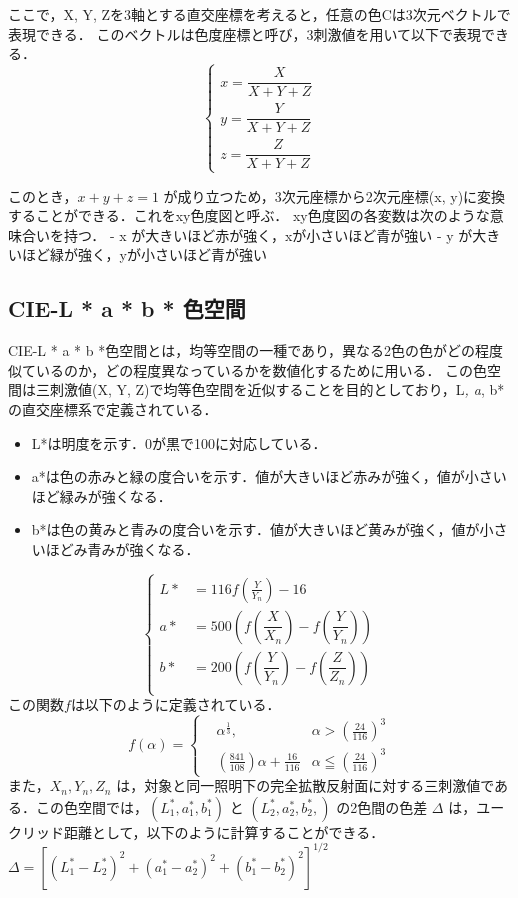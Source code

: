 \documentclass[
]{article}
\begin{document}
ここで，X, Y,
Zを3軸とする直交座標を考えると，任意の色Cは3次元ベクトルで表現できる．
このベクトルは色度座標と呼び，3刺激値を用いて以下で表現できる． 
\begin{equation}
\left\{
\begin{aligned}
    x = \dfrac{X}{X + Y + Z} \\
    y = \dfrac{Y}{X + Y + Z} \\
    z = \dfrac{Z}{X + Y + Z} 
\end{aligned}
\right.
\end{equation}

このとき，\(x + y + z = 1\) が成り立つため，3次元座標から2次元座標(x,
y)に変換することができる．これをxy色度図と呼ぶ．
xy色度図の各変数は次のような意味合いを持つ． - x
が大きいほど赤が強く，xが小さいほど青が強い - y
が大きいほど緑が強く，yが小さいほど青が強い

\hypertarget{cie-l-a-b-ux8272ux7a7aux9593}{%
\subsection{CIE-L * a * b * 色空間}\label{cie-l-a-b-ux8272ux7a7aux9593}}

CIE-L * a * b *色空間とは，均等空間の一種であり，異なる2色の色がどの程度似ているのか，どの程度異なっているかを数値化するために用いる．
この色空間は三刺激値(X, Y,
Z)で均等色空間を近似することを目的としており，L\emph{, a}, b*
の直交座標系で定義されている． 
\begin{itemize}
  \item L*は明度を示す．0が黒で100に対応している． 
  \item a*は色の赤みと緑の度合いを示す．値が大きいほど赤みが強く，値が小さいほど緑みが強くなる．
  \item b*は色の黄みと青みの度合いを示す．値が大きいほど黄みが強く，値が小さいほどみ青みが強くなる．
\end{itemize}
\begin{equation}
\left\{
\begin{aligned}
    L* &= 116f\left(\frac{Y}{Y_n}\right)-16 \\
    a* &= 500\left(f\left(\dfrac{X}{X_n}\right) - f\left(\dfrac{Y}{Y_n}\right)\right) \\
    b* &= 200\left(f\left(\dfrac{Y}{Y_n}\right) - f\left(\dfrac{Z}{Z_n}\right)\right) \\
\end{aligned}
\right.
\end{equation}
この関数\(f\)は以下のように定義されている．
\begin{equation}
f(\alpha) =
\left\{
\begin{aligned}
&\alpha^{\frac{1}{3}}, & \alpha > \left(\frac{24}{116}\right)^3 \\
&(\frac{841}{108})\alpha + \frac{16}{116} &\alpha \leqq \left(\frac{24}{116}\right)^3
\end{aligned}
\right.
\end{equation}
 また，\(X_n, Y_n, Z_n\)
は，対象と同一照明下の完全拡散反射面に対する三刺激値である．この色空間では，\((L^*_1, a^*_1, b^*_1)\)
と \((L^*_2, a^*_2, b^*_2,)\) の2色間の色差 \(\Delta\)
は，ユークリッド距離として，以下のように計算することができる．
\(\Delta = [(L^*_1- L^*_2)^2 + (a^*_1 - a^*_2)^2 + (b^*_1 - b^*_2)^2]^{1/2}\)
\end{document}
